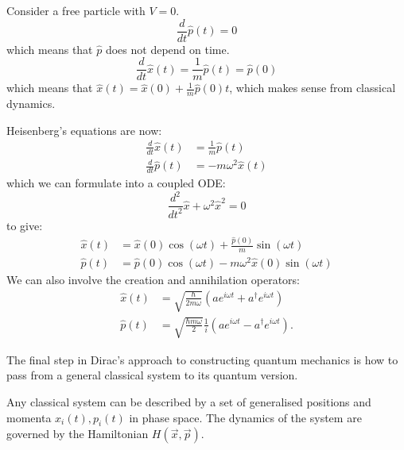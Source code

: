 \documentclass[../Main.tex]{subfiles}
\begin{document}
\begin{example}
    Consider a free particle with $V = 0$.
    \begin{equation*}
        \frac{d}{dt} \hat{p}(t) = 0
    \end{equation*}
    which means that $\hat{p}$ does not depend on time.
    \begin{equation*}
        \frac{d}{dt} \hat{x}(t) = \frac1m \hat{p}(t) = \hat{p}(0)
    \end{equation*}
    which means that $\hat{x}(t) = \hat{x}(0) + \frac1m \hat{p}(0) t$, which makes sense from classical dynamics.
\end{example}
\begin{example}
    Heisenberg's equations are now:
    \begin{align*}
        \frac{d}{dt} \hat{x}(t) &= \frac1m \hat{p}(t) \\
        \frac{d}{dt} \hat{p}(t) &= -m\omega^2 \hat{x}(t)
    \end{align*}
    which we can formulate into a coupled ODE:
    \begin{equation*}
        \frac{d^{2}}{dt^{2}} \hat{x} + \omega^2 \hat{x}^2 = 0
    \end{equation*}
    to give:
    \begin{align*}
        \hat{x}(t) &=\hat{x}(0) \cos(\omega t) + \frac{\hat{p}(0)}{m}\sin(\omega t) \\
        \hat{p}(t) &=\hat{p}(0) \cos(\omega t) - m\omega^2 \hat{x}(0) \sin(\omega t)
    \end{align*}
    We can also involve the creation and annihilation operators:
    \begin{align*}
        \hat{x}(t) &= \sqrt{\frac{\hbar}{2m\omega}} \left(ae^{i\omega t} + a^\dagger e^{i\omega t}\right) \\
        \hat{p}(t) &= \sqrt{\frac{\hbar m \omega}{2}} \frac1i \left(ae^{i\omega t} - a^\dagger e^{i\omega t}\right).
    \end{align*}
\end{example}
The final step in Dirac's approach to constructing quantum mechanics is how to pass from a general classical system to its quantum version.

Any classical system can be described by a set of generalised positions and momenta $x_i(t), p_i(t)$ in phase space. The dynamics of the system are governed by the Hamiltonian $H(\vec{x}, \vec{p})$.
\end{document}
